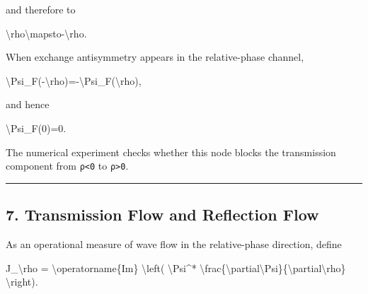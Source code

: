 \documentclass[
  a4paper,
]{article}
\newenvironment{Shaded}{}{}
\newcommand{\NormalTok}[1]{#1}
\begin{document}
and therefore to

\begin{Shaded}
\begin{Highlighting}[]
\NormalTok{\textbackslash{}rho\textbackslash{}mapsto{-}\textbackslash{}rho.}
\end{Highlighting}
\end{Shaded}

When exchange antisymmetry appears in the relative-phase channel,

\begin{Shaded}
\begin{Highlighting}[]
\NormalTok{\textbackslash{}Psi\_F({-}\textbackslash{}rho)={-}\textbackslash{}Psi\_F(\textbackslash{}rho),}
\end{Highlighting}
\end{Shaded}

and hence

\begin{Shaded}
\begin{Highlighting}[]
\NormalTok{\textbackslash{}Psi\_F(0)=0.}
\end{Highlighting}
\end{Shaded}

The numerical experiment checks whether this node blocks the
transmission component from \texttt{ρ\textless{}0} to
\texttt{ρ\textgreater{}0}.

\begin{center}\rule{0.5\linewidth}{0.5pt}\end{center}

\subsection{7. Transmission Flow and Reflection
Flow}\label{transmission-flow-and-reflection-flow}

As an operational measure of wave flow in the relative-phase direction,
define

\begin{Shaded}
\begin{Highlighting}[]
\NormalTok{J\_\textbackslash{}rho}
\NormalTok{=}
\NormalTok{\textbackslash{}operatorname\{Im\}}
\NormalTok{\textbackslash{}left(}
\NormalTok{\textbackslash{}Psi\^{}*}
\NormalTok{\textbackslash{}frac\{\textbackslash{}partial\textbackslash{}Psi\}\{\textbackslash{}partial\textbackslash{}rho\}}
\NormalTok{\textbackslash{}right).}
\end{Highlighting}
\end{Shaded}
\end{document}
